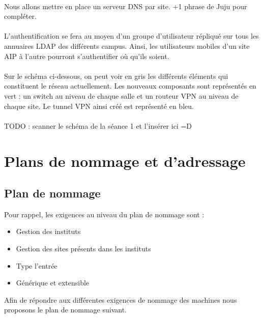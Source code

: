 \documentclass[a4paper]{article}
\begin{document}
	\paragraph*{} %
	Nous allons mettre en place un serveur DNS par site. +1 phrase de Juju pour compléter. 
	
	\paragraph*{} %
	L'authentification se fera au moyen d'un groupe d'utilisateur répliqué sur tous les annuaires LDAP des différents campus. Ainsi, les utilisateurs mobiles d'un site AIP à l'autre pourront s'authentifier où qu'ils soient. 
	
	\paragraph*{} %
	Sur le schéma ci-dessous, on peut voir en gris les différents éléments qui constituent le réseau actuellement. Les nouveaux composants sont représentés en vert : un switch au niveau de chaque salle et un routeur VPN au niveau de chaque site. Le tunnel VPN ainsi créé est représenté en bleu. 
	
	\paragraph*{} %
	TODO : scanner le schéma de la séance 1 et l'insérer ici =D 

	
\section{Plans de nommage et d'adressage}
	\subsection{Plan de nommage}

	Pour rappel, les exigences au niveau du plan de nommage sont :\\
	\begin{itemize}
	\item Gestion des instituts
	\item Gestion des sites présents dans les instituts
	\item Type l'entrée
	\item Générique et extensible
	\end{itemize}	

	Afin de répondre aux différentes exigences de nommage des machines nous proposons le plan de nommage suivant.	
	
\end{document}

